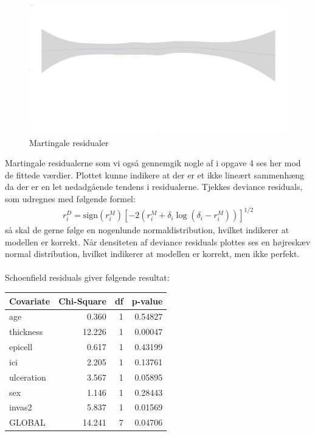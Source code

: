 \newpage
    \begin{figure}[h]
    \centering
    \includegraphics[width=1\linewidth]{Basses_kode/Billeder_duration/martingale_residuals_against_fitted_values.pdf}
    \caption{Martingale residualer}
    \label{fig:enter-label}
\end{figure}
\noindent Martingale residualerne som vi også gennemgik nogle af i opgave 4 ses her mod de fittede værdier. Plottet kunne indikere at der er et ikke lineært sammenhæng da der er en let nedadgående tendens i residualerne.
\pause
Tjekkes deviance residuals, som udregnes med følgende formel: 
\begin{align}
r_i^D = \text{sign}(r_i^M) \left[ -2 \left( r_i^M + \delta_i \log(\delta_i - r_i^M) \right) \right]^{1/2}
\end{align} 
så skal de gerne følge en nogenlunde normaldistribution, hvilket indikerer at modellen er korrekt. Når densiteten af deviance residuals plottes ses en højreskæv normal distribution, hvilket indikerer at modellen er korrekt, men ikke perfekt.\\\\

\noindent Schoenfield residuals giver følgende resultat:
\begin{table}[h!]
\centering
\begin{tabular}{lrrr}
\hline
Covariate & Chi-Square & df & p-value \\
\hline
age        & 0.360     & 1  & 0.54827 \\
thickness  & 12.226    & 1  & 0.00047 \\
epicell    & 0.617     & 1  & 0.43199 \\
ici        & 2.205     & 1  & 0.13761 \\
ulceration & 3.567     & 1  & 0.05895 \\
sex        & 1.146     & 1  & 0.28443 \\
invas2     & 5.837     & 1  & 0.01569 \\
\hline
GLOBAL     & 14.241    & 7  & 0.04706 \\
\hline
\end{tabular}
\end{table}

